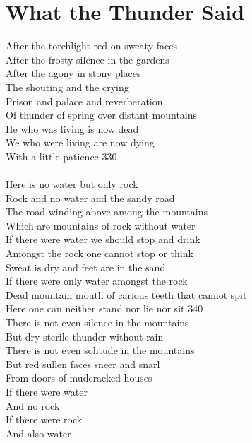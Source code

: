 \documentclass{article}
\begin{document}
\section{What the Thunder Said}

After the torchlight red on sweaty faces \\
After the frosty silence in the gardens \\
After the agony in stony places \\
The shouting and the crying \\
Prison and palace and reverberation \\
Of thunder of spring over distant mountains \\
He who was living is now dead \\
We who were living are now dying \\
With a little patience                                           \hfill 330 \\
 \\
Here is no water but only rock \\
Rock and no water and the sandy road \\
The road winding above among the mountains \\
Which are mountains of rock without water \\
If there were water we should stop and drink \\
Amongst the rock one cannot stop or think \\
Sweat is dry and feet are in the sand \\
If there were only water amongst the rock \\
Dead mountain mouth of carious teeth that cannot spit \\
Here one can neither stand nor lie nor sit                       \hfill 340 \\
There is not even silence in the mountains \\
But dry sterile thunder without rain \\
There is not even solitude in the mountains \\
But red sullen faces sneer and snarl \\
From doors of mudcracked houses \\
\hspace*{3.5in} If there were water \\
And no rock \\
If there were rock \\
And also water \\
\end{document}
